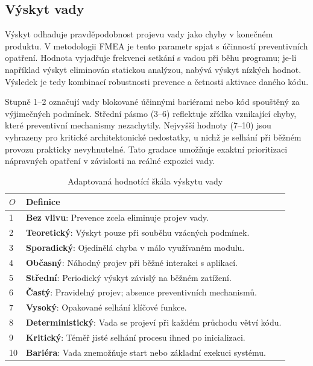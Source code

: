 \documentclass[FM,DP,fonts]{tulthesis}
\renewcommand{\arraystretch}{1.2}
\begin{document}
\subsection{Výskyt vady}
Výskyt odhaduje pravděpodobnost projevu vady jako chyby v konečném produktu. V metodologii FMEA je tento parametr spjat s účinností preventivních opatření. Hodnota vyjadřuje frekvenci setkání s vadou při běhu programu; je-li například výskyt eliminován statickou analýzou, nabývá výskyt nízkých hodnot. Výsledek je tedy kombinací robustnosti prevence a četnosti aktivace daného kódu.

Stupně 1–2 označují vady blokované účinnými bariérami nebo kód spouštěný za výjimečných podmínek. Střední pásmo (3–6) reflektuje zřídka vznikající chyby, které preventivní mechanismy nezachytily. Nejvyšší hodnoty (7–10) jsou vyhrazeny pro kritické architektonické nedostatky, u nichž je selhání při běžném provozu prakticky nevyhnutelné. Tato gradace umožňuje exaktní prioritizaci nápravných opatření v závislosti na reálné expozici vady.

\begin{table}[p]
	\centering
	\caption{Adaptovaná hodnotící škála výskytu vady}
	\renewcommand{\arraystretch}{1.5}
	\begin{tabularx}{\textwidth}{|l|X|}
		\hline
		$O$ & \textbf{Definice}                                                         \\ \hline
		1   & \textbf{Bez vlivu}: Prevence zcela eliminuje projev vady.                 \\ \hline
		2   & \textbf{Teoretický}: Výskyt pouze při souběhu vzácných podmínek.          \\ \hline
		3   & \textbf{Sporadický}: Ojedinělá chyba v málo využívaném modulu.            \\ \hline
		4   & \textbf{Občasný}: Náhodný projev při běžné interakci s aplikací.          \\ \hline
		5   & \textbf{Střední}: Periodický výskyt závislý na běžném zatížení.           \\ \hline
		6   & \textbf{Častý}: Pravidelný projev; absence preventivních mechanismů.      \\ \hline
		7   & \textbf{Vysoký}: Opakované selhání klíčové funkce.                        \\ \hline
		8   & \textbf{Deterministický}: Vada se projeví při každém průchodu větví kódu. \\ \hline
		9   & \textbf{Kritický}: Téměř jisté selhání procesu ihned po inicializaci.     \\ \hline
		10  & \textbf{Bariéra}: Vada znemožňuje start nebo základní exekuci systému.    \\ \hline
	\end{tabularx}
\end{table}
\end{document}
